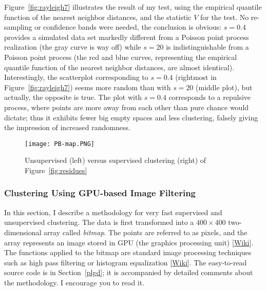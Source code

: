 \documentclass[10pt]{article}
\begin{document}
Figure~\ref{fig:rayleigh7} illustrates the result of my test, using the empirical quantile function of the nearest neighbor distances, and the statistic $V$ for the test. No re-sampling or confidence bands were needed, the conclusion is obvious: $s=0.4$ provides a simulated data set markedly different from a Poisson point process realization (the gray curve is way off) while $s=20$ is indistinguishable from a Poisson point process (the red and blue curves, representing the empirical quantile function of the \textcolor{index}{nearest neighbor distances}, are almost identical). Interestingly, the scatterplot corresponding to $s=0.4$ (rightmost in Figure~\ref{fig:rayleigh7}) seems more random than with $s=20$ (middle plot), but actually, the opposite is true. The plot with $s=0.4$ corresponds to a \textcolor{index}{repulsive process}, where points are more away from each other than pure chance would dictate; thus it exhibits fewer big empty spaces and less clustering, falsely giving the impression of increased randomness.

\begin{figure}[H]
\centering
\texttt{[image: PB-map.PNG]}
\caption{Unsupervised (left) versus supervised clustering (right) of Figure~\ref{fig:residues}}
\label{fig:map}
\end{figure}

\subsubsection{Clustering Using GPU-based Image Filtering}\label{spa2}

In this section, I describe a methodology for very fast supervised and unsupervised 
\textcolor{index}{clustering}. The data is first transformed into a 
$400 \times 400$ two-dimensional array called {\em bitmap}. The points are referred to as pixels, and the array represents an image stored in 
\textcolor{index}{GPU} 
(the graphics processing unit) [\href{https://en.wikipedia.org/wiki/General-purpose_computing_on_graphics_processing_units}{Wiki}]. The functions applied to the bitmap are standard image processing techniques such as high pass \textcolor{index}{filtering} or 
\textcolor{index}{histogram equalization} [\href{https://en.wikipedia.org/wiki/Histogram_equalization}{Wiki}]. 
The easy-to-read source code is in Section~\ref{plgd}; it is accompanied by detailed comments about the methodology. I encourage you to read it. 
\end{document}
